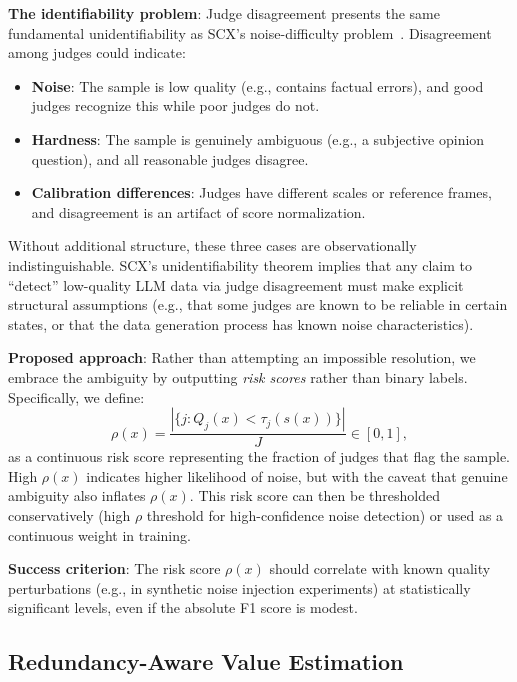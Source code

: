 \documentclass[11pt,twocolumn]{article}
\begin{document}
\textbf{The identifiability problem}: Judge disagreement presents the same fundamental unidentifiability as SCX's noise-difficulty problem~\cite{scx2026}. Disagreement among judges could indicate:
\begin{itemize}
    \item \textbf{Noise}: The sample is low quality (e.g., contains factual errors), and good judges recognize this while poor judges do not.
    \item \textbf{Hardness}: The sample is genuinely ambiguous (e.g., a subjective opinion question), and all reasonable judges disagree.
    \item \textbf{Calibration differences}: Judges have different scales or reference frames, and disagreement is an artifact of score normalization.
\end{itemize}

Without additional structure, these three cases are observationally indistinguishable. SCX's unidentifiability theorem implies that any claim to ``detect'' low-quality LLM data via judge disagreement must make explicit structural assumptions (e.g., that some judges are known to be reliable in certain states, or that the data generation process has known noise characteristics).

\textbf{Proposed approach}: Rather than attempting an impossible resolution, we embrace the ambiguity by outputting \textit{risk scores} rather than binary labels. Specifically, we define:
\begin{equation}
\rho(x) = \frac{|\{j: Q_j(x) < \tau_j(s(x))\}|}{J} \in [0, 1],
\label{eq:risk_score}
\end{equation}
as a continuous risk score representing the fraction of judges that flag the sample. High $\rho(x)$ indicates higher likelihood of noise, but with the caveat that genuine ambiguity also inflates $\rho(x)$. This risk score can then be thresholded conservatively (high $\rho$ threshold for high-confidence noise detection) or used as a continuous weight in training.

\textbf{Success criterion}: The risk score $\rho(x)$ should correlate with known quality perturbations (e.g., in synthetic noise injection experiments) at statistically significant levels, even if the absolute F1 score is modest.

\subsection{Redundancy-Aware Value Estimation}
\label{sec:redundancy}
\end{document}
